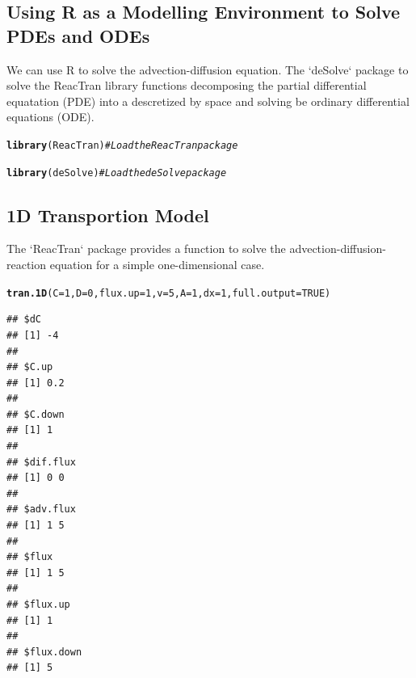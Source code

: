 \documentclass{tufte-handout}\usepackage[]{graphicx}\usepackage[]{xcolor}
\makeatletter
\newcommand{\hlnum}[1]{\textcolor[rgb]{0.686,0.059,0.569}{#1}}%
\newcommand{\hlcom}[1]{\textcolor[rgb]{0.678,0.584,0.686}{\textit{#1}}}%
\newcommand{\hlstd}[1]{\textcolor[rgb]{0.345,0.345,0.345}{#1}}%
\newcommand{\hlkwc}[1]{\textcolor[rgb]{0.333,0.667,0.333}{#1}}%
\newcommand{\hlkwd}[1]{\textcolor[rgb]{0.737,0.353,0.396}{\textbf{#1}}}%
\newenvironment{kframe}{%
 \def\at@end@of@kframe{}%
 \ifinner\ifhmode%
  \def\at@end@of@kframe{\end{minipage}}%
  \begin{minipage}{\columnwidth}%
 \fi\fi%
 \def\FrameCommand##1{\hskip\@totalleftmargin \hskip-\fboxsep
 \colorbox{shadecolor}{##1}\hskip-\fboxsep
     \hskip-\linewidth \hskip-\@totalleftmargin \hskip\columnwidth}%
 \MakeFramed {\advance\hsize-\width
   \@totalleftmargin\z@ \linewidth\hsize
   \@setminipage}}%
 {\par\unskip\endMakeFramed%
 \at@end@of@kframe}
\newenvironment{knitrout}{}{} %
\makeatother
\begin{document}
\subsection{Using R as a Modelling Environment to Solve PDEs and ODEs}

We can use R to solve the advection-diffusion equation. The `deSolve` package to solve the ReacTran library functions decomposing the partial differential equatation (PDE) into a descretized by space and solving be ordinary differential equations (ODE). 

\begin{knitrout}
\color{fgcolor}\begin{kframe}
\begin{alltt}
\hlkwd{library}\hlstd{(ReacTran)} \hlcom{# Load the ReacTran package}
\end{alltt}


{\ttfamily\noindent\itshape\color{messagecolor}{\#\# Loading required package: rootSolve}}

{\ttfamily\noindent\itshape\color{messagecolor}{\#\# Loading required package: deSolve}}

{\ttfamily\noindent\itshape\color{messagecolor}{\#\# Loading required package: shape}}\begin{alltt}
\hlkwd{library}\hlstd{(deSolve)} \hlcom{# Load the deSolve package}
\end{alltt}
\end{kframe}
\end{knitrout}

\subsection{1D Transportion Model}

The `ReacTran` package provides a function to solve the advection-diffusion-reaction equation for a simple one-dimensional case.

\begin{knitrout}
\color{fgcolor}\begin{kframe}
\begin{alltt}
\hlkwd{tran.1D}\hlstd{(}\hlkwc{C} \hlstd{=} \hlnum{1}\hlstd{,} \hlkwc{D} \hlstd{=} \hlnum{0}\hlstd{,} \hlkwc{flux.up} \hlstd{=} \hlnum{1}\hlstd{,} \hlkwc{v} \hlstd{=} \hlnum{5}\hlstd{,} \hlkwc{A}\hlstd{=} \hlnum{1}\hlstd{,} \hlkwc{dx} \hlstd{=} \hlnum{1}\hlstd{,} \hlkwc{full.output} \hlstd{=} \hlnum{TRUE}\hlstd{)}
\end{alltt}
\begin{verbatim}
## $dC
## [1] -4
## 
## $C.up
## [1] 0.2
## 
## $C.down
## [1] 1
## 
## $dif.flux
## [1] 0 0
## 
## $adv.flux
## [1] 1 5
## 
## $flux
## [1] 1 5
## 
## $flux.up
## [1] 1
## 
## $flux.down
## [1] 5
\end{verbatim}
\end{kframe}
\end{knitrout}
\end{document}
